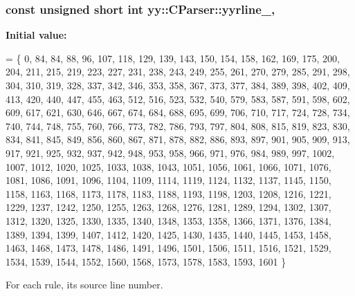 \hypertarget{classyy_1_1CParser_a78a3b99047240a491d46271231c42adb}{
\subsubsection[{yyrline\-\_\-}]{\setlength{\rightskip}{0pt plus 5cm}const unsigned short int yy\-::\-C\-Parser\-::yyrline\-\_\-\hspace{0.3cm}{\ttfamily [static]}, {\ttfamily [private]}}}\label{classyy_1_1CParser_a78a3b99047240a491d46271231c42adb}
{\bfseries Initial value\-:}
\begin{DoxyCode}
=
  \{
         0,    84,    84,    88,    96,   107,   118,   129,   139,   143,
     150,   154,   158,   162,   169,   175,   200,   204,   211,   215,
     219,   223,   227,   231,   238,   243,   249,   255,   261,   270,
     279,   285,   291,   298,   304,   310,   319,   328,   337,   342,
     346,   353,   358,   367,   373,   377,   384,   389,   398,   402,
     409,   413,   420,   440,   447,   455,   463,   512,   516,   523,
     532,   540,   579,   583,   587,   591,   598,   602,   609,   617,
     621,   630,   646,   667,   674,   684,   688,   695,   699,   706,
     710,   717,   724,   728,   734,   740,   744,   748,   755,   760,
     766,   773,   782,   786,   793,   797,   804,   808,   815,   819,
     823,   830,   834,   841,   845,   849,   856,   860,   867,   871,
     878,   882,   886,   893,   897,   901,   905,   909,   913,   917,
     921,   925,   932,   937,   942,   948,   953,   958,   966,   971,
     976,   984,   989,   997,  1002,  1007,  1012,  1020,  1025,  1033,
    1038,  1043,  1051,  1056,  1061,  1066,  1071,  1076,  1081,  1086,
    1091,  1096,  1104,  1109,  1114,  1119,  1124,  1132,  1137,  1145,
    1150,  1158,  1163,  1168,  1173,  1178,  1183,  1188,  1193,  1198,
    1203,  1208,  1216,  1221,  1229,  1237,  1242,  1250,  1255,  1263,
    1268,  1276,  1281,  1289,  1294,  1302,  1307,  1312,  1320,  1325,
    1330,  1335,  1340,  1348,  1353,  1358,  1366,  1371,  1376,  1384,
    1389,  1394,  1399,  1407,  1412,  1420,  1425,  1430,  1435,  1440,
    1445,  1453,  1458,  1463,  1468,  1473,  1478,  1486,  1491,  1496,
    1501,  1506,  1511,  1516,  1521,  1529,  1534,  1539,  1544,  1552,
    1560,  1568,  1573,  1578,  1583,  1593,  1601
  \}
\end{DoxyCode}


For each rule, its source line number. 

